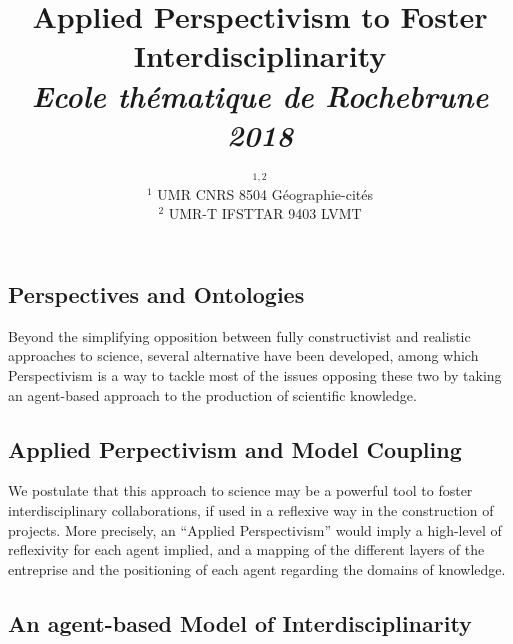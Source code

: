 


\title{Applied Perspectivism to Foster Interdisciplinarity\\\medskip
\textit{Ecole thématique de Rochebrune 2018}
}
\author{$^{1,2}$\\
$^{1}$ UMR CNRS 8504 Géographie-cités\\
$^{2}$ UMR-T IFSTTAR 9403 LVMT
}
\date{}


\maketitle

\justify

\begin{abstract}
	
\end{abstract}




\subsection*{Perspectives and Ontologies}

Beyond the simplifying opposition between fully constructivist and realistic approaches to science, several alternative have been developed, among which Perspectivism \cite{giere2010scientific} is a way to tackle most of the issues opposing these two by taking an agent-based approach to the production of scientific knowledge. 




\subsection*{Applied Perpectivism and Model Coupling}


We postulate that this approach to science may be a powerful tool to foster interdisciplinary collaborations, if used in a reflexive way in the construction of projects. More precisely, an ``Applied Perspectivism'' would imply a high-level of reflexivity for each agent implied, and a mapping of the different layers of the entreprise and the positioning of each agent regarding the domains of knowledge.




\subsection*{An agent-based Model of Interdisciplinarity}

